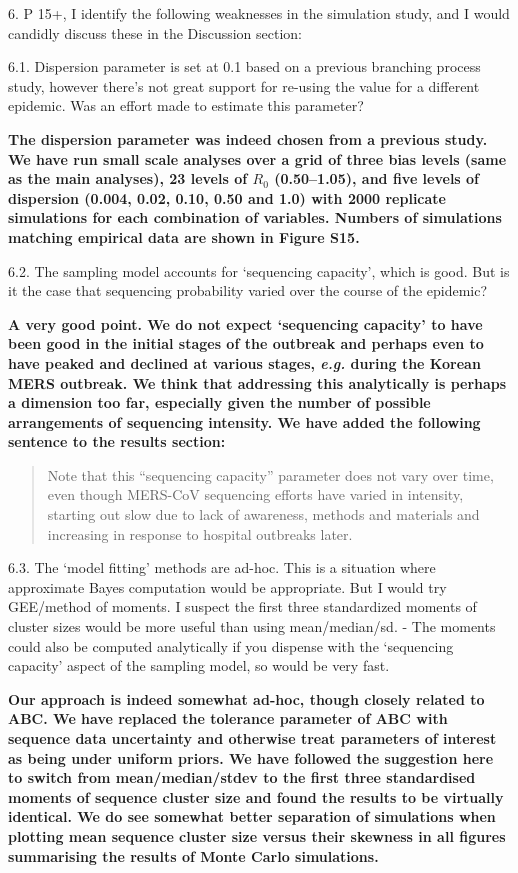 \documentclass[11pt,oneside,letterpaper]{article}
\begin{document}
\textbf{}

6. P 15+, I identify the following weaknesses in the simulation study, and I would candidly discuss these in the Discussion section:

6.1. Dispersion parameter is set at 0.1 based on a previous branching process study, however there's not great support for re-using the value for a different epidemic. Was an effort made to estimate this parameter?

\textbf{The dispersion parameter was indeed chosen from a previous study. We have run small scale analyses over a grid of three bias levels (same as the main analyses), 23 levels of $R_{0}$ (0.50--1.05), and five levels of dispersion (0.004, 0.02, 0.10, 0.50 and 1.0) with 2000 replicate simulations for each combination of variables. Numbers of simulations matching empirical data are shown in Figure S15.}

6.2. The sampling model accounts for `sequencing capacity', which is good. But is it the case that sequencing probability varied over the course of the epidemic?

\textbf{A very good point. We do not expect `sequencing capacity' to have been good in the initial stages of the outbreak and perhaps even to have peaked and declined at various stages, \textit{e.g.} during the Korean MERS outbreak. We think that addressing this analytically is perhaps a dimension too far, especially given the number of possible arrangements of sequencing intensity. We have added the following sentence to the results section:}

\begin{quotation}
Note that this ``sequencing capacity'' parameter does not vary over time, even though MERS-CoV sequencing efforts have varied in intensity, starting out slow due to lack of awareness, methods and materials and increasing in response to hospital outbreaks later.
\end{quotation}

6.3. The `model fitting' methods are ad-hoc. This is a situation where approximate Bayes computation would be appropriate. But I would try GEE/method of moments. I suspect the first three standardized moments of cluster sizes would be more useful than using mean/median/sd. - The moments could also be computed analytically if you dispense with the `sequencing capacity' aspect of the sampling model, so would be very fast.

\textbf{Our approach is indeed somewhat ad-hoc, though closely related to ABC. We have replaced the tolerance parameter of ABC with sequence data uncertainty and otherwise treat parameters of interest as being under uniform priors. We have followed the suggestion here to switch from mean/median/stdev to the first three standardised moments of sequence cluster size and found the results to be virtually identical. We do see somewhat better separation of simulations when plotting mean sequence cluster size versus their skewness in all figures summarising the results of Monte Carlo simulations.}
\end{document}
